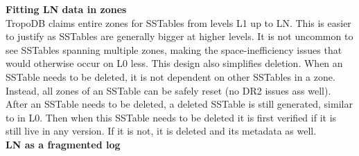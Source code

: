 \textbf{Fitting LN data in zones}\\
TropoDB claims entire zones for SSTables from levels L1 up to LN. This is easier to justify as SSTables are generally bigger at higher levels. It is not uncommon to see SSTables spanning multiple zones, making the space-inefficiency issues that would otherwise occur on L0 less. This design also simplifies deletion. When an SSTable needs to be deleted, it is not dependent on other SSTables in a zone. Instead, all zones of an SSTable can be safely reset (no DR2 issues ass well). After an SSTable needs to be deleted, a deleted SSTable is still generated, similar to in L0. Then when this SSTable needs to be deleted it is first verified if it is still live in any version. If it is not, it is deleted and its metadata as well.\\
\textbf{LN as a fragmented log}\\
